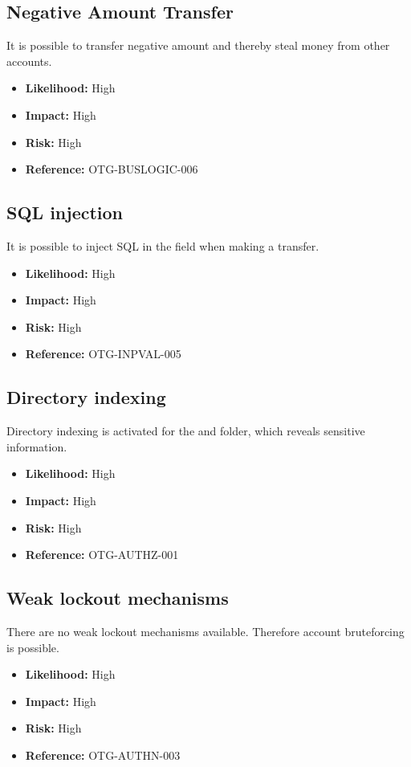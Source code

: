 \subsection{Negative Amount Transfer}
It is possible to transfer negative amount and thereby steal money from other accounts.
\begin{itemize}
	\item \textbf{Likelihood:} High
	\item \textbf{Impact:} High
	\item \textbf{Risk:} High
	\item \textbf{Reference:} OTG-BUSLOGIC-006
\end{itemize}

\subsection{SQL injection}
It is possible to inject SQL in the field  when making a transfer.
\begin{itemize}
	\item \textbf{Likelihood:} High
	\item \textbf{Impact:} High
	\item \textbf{Risk:} High
	\item \textbf{Reference:} OTG-INPVAL-005
\end{itemize}

\subsection{Directory indexing}
Directory indexing is activated for the  and  folder, which reveals sensitive information.
\begin{itemize}
	\item \textbf{Likelihood:} High
	\item \textbf{Impact:} High
	\item \textbf{Risk:} High
	\item \textbf{Reference:} OTG-AUTHZ-001
\end{itemize}

\subsection{Weak lockout mechanisms}
There are no weak lockout mechanisms available. Therefore account bruteforcing is possible.
\begin{itemize}
	\item \textbf{Likelihood:} High
	\item \textbf{Impact:} High
	\item \textbf{Risk:} High
	\item \textbf{Reference:} OTG-AUTHN-003
\end{itemize}


